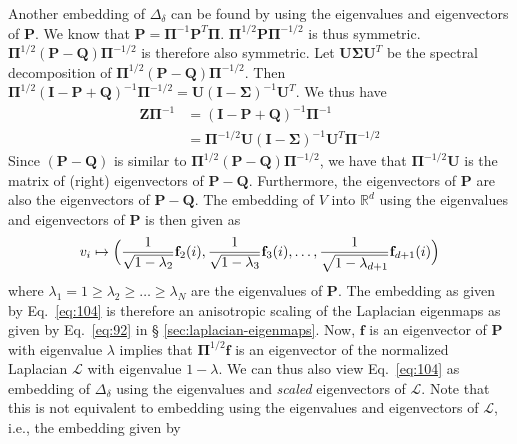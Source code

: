 %
%
\noindent Another embedding of $\Delta_\delta$ can be found by using
the eigenvalues and eigenvectors of $\mathbf{P}$. We know that
$\mathbf{P} = \bm{\Pi}^{-1}\mathbf{P}^{T}\bm{\Pi}$.
$\bm{\Pi}^{1/2}\mathbf{P}\bm{\Pi}^{-1/2}$ is thus symmetric.
$\bm{\Pi}^{1/2}(\mathbf{P} - \mathbf{Q})\bm{\Pi}^{-1/2}$ is therefore
also symmetric. Let $\mathbf{U}\bm{\Sigma}\mathbf{U}^{T}$ be the
spectral decomposition of $\bm{\Pi}^{1/2}(\mathbf{P} -
\mathbf{Q})\bm{\Pi}^{-1/2}$. Then $\bm{\Pi}^{1/2}(\mathbf{I} -
\mathbf{P} + \mathbf{Q})^{-1}\bm{\Pi}^{-1/2} = \mathbf{U}(\mathbf{I} -
\bm{\Sigma})^{-1}\mathbf{U}^{T}$. We thus have
\begin{equation}
  \label{eq:105}
  \begin{split}
  \mathbf{Z}\bm{\Pi}^{-1} &=  (\mathbf{I} - \mathbf{P} +
  \mathbf{Q})^{-1}\bm{\Pi}^{-1} \\ 
  &= \bm{\Pi}^{-1/2} \mathbf{U}(\mathbf{I} -
  \bm{\Sigma})^{-1}\mathbf{U}^{T}\bm{\Pi}^{-1/2} 
  \end{split}
\end{equation}
Since $(\mathbf{P} - \mathbf{Q})$ is similar to
$\bm{\Pi}^{1/2}(\mathbf{P} - \mathbf{Q})\bm{\Pi}^{-1/2}$, we have
that $\bm{\Pi}^{-1/2}\mathbf{U}$ is the matrix of (right) eigenvectors of
$\mathbf{P} - \mathbf{Q}$. Furthermore, the eigenvectors of
$\mathbf{P}$ are also the eigenvectors of $\mathbf{P} - \mathbf{Q}$. 
The embedding of $V$ into $\mathbb{R}^{d}$ using the eigenvalues and
eigenvectors of $\mathbf{P}$ is then given as
\begin{equation}
  \label{eq:104}
  v_i \mapsto \Bigl( \frac{1}{\sqrt{1 - \lambda_2}} \mathbf{f}_2(i),
    \frac{1}{\sqrt{1 - \lambda_3}}\mathbf{f}_3(i), \dots, \frac{1}{\sqrt{1 -
          \lambda_{d+1}}} \mathbf{f}_{d+1}(i) \Bigr)
\end{equation}
where $\lambda_1 = 1 \geq \lambda_2 \geq \dots \geq \lambda_N$ are the
eigenvalues of $\mathbf{P}$. The embedding as given by
Eq.~\eqref{eq:104} is therefore an anisotropic scaling of the
Laplacian eigenmaps as given by Eq.~\eqref{eq:92} in \S
\ref{sec:laplacian-eigenmaps}. Now, $\mathbf{f}$ is an eigenvector of
$\mathbf{P}$ with eigenvalue $\lambda$ implies that
$\bm{\Pi}^{1/2}\mathbf{f}$ is an eigenvector of the normalized
Laplacian $\bm{\mathcal{L}}$ with eigenvalue $1 - \lambda$. We can
thus also view Eq.~\eqref{eq:104} as embedding of $\Delta_\delta$
using the eigenvalues and \emph{scaled} eigenvectors of
$\bm{\mathcal{L}}$. Note that this is not equivalent to
embedding using the eigenvalues and eigenvectors of
$\bm{\mathcal{L}}$, i.e., the embedding given by

